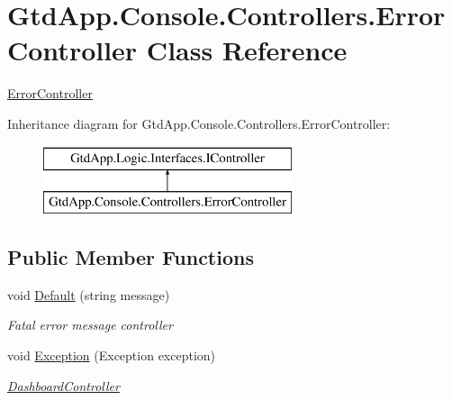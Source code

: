 \hypertarget{class_gtd_app_1_1_console_1_1_controllers_1_1_error_controller}{}\section{Gtd\+App.\+Console.\+Controllers.\+Error\+Controller Class Reference}
\label{class_gtd_app_1_1_console_1_1_controllers_1_1_error_controller}


\mbox{\hyperlink{class_gtd_app_1_1_console_1_1_controllers_1_1_error_controller}{Error\+Controller}}  


Inheritance diagram for Gtd\+App.\+Console.\+Controllers.\+Error\+Controller\+:\begin{figure}[H]
\begin{center}
\leavevmode
\includegraphics[height=2.000000cm]{class_gtd_app_1_1_console_1_1_controllers_1_1_error_controller}
\end{center}
\end{figure}
\subsection*{Public Member Functions}
\begin{DoxyCompactItemize}
\item 
void \mbox{\hyperlink{class_gtd_app_1_1_console_1_1_controllers_1_1_error_controller_a855f060a3ea47d219692fb702fbbb358}{Default}} (string message)
\begin{DoxyCompactList}\small\item\em Fatal error message controller \end{DoxyCompactList}\item 
void \mbox{\hyperlink{class_gtd_app_1_1_console_1_1_controllers_1_1_error_controller_a7521005fa5016ada44e80e173f53cffe}{Exception}} (Exception exception)
\begin{DoxyCompactList}\small\item\em \mbox{\hyperlink{class_gtd_app_1_1_console_1_1_controllers_1_1_dashboard_controller}{Dashboard\+Controller}} \end{DoxyCompactList}\end{DoxyCompactItemize}


